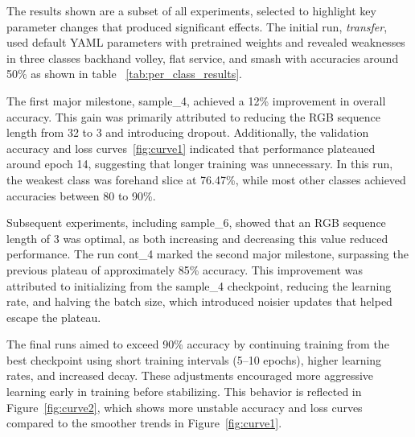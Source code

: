 \documentclass[pdflatex,sn-mathphys-num]{sn-jnl}%
\theoremstyle{thmstyleone}%
\theoremstyle{thmstyletwo}%
\theoremstyle{thmstylethree}%
\begin{document}
The results shown are a subset of all experiments, selected to highlight key parameter changes that produced significant effects. The initial run, \textit{transfer}, used default YAML parameters with pretrained weights and revealed weaknesses in three classes backhand volley, flat service, and smash with accuracies around 50\% as shown in table ~\ref{tab:per_class_results}.

The first major milestone, sample\_4, achieved a 12\% improvement in overall accuracy. This gain was primarily attributed to reducing the RGB sequence length from 32 to 3 and introducing dropout. Additionally, the validation accuracy and loss curves~\ref{fig:curve1} indicated that performance plateaued around epoch 14, suggesting that longer training was unnecessary. In this run, the weakest class was forehand slice at 76.47\%, while most other classes achieved accuracies between 80 to 90\%.

Subsequent experiments, including sample\_6, showed that an RGB sequence length of 3 was optimal, as both increasing and decreasing this value reduced performance. The run cont\_4 marked the second major milestone, surpassing the previous plateau of approximately 85\% accuracy. This improvement was attributed to initializing from the sample\_4 checkpoint, reducing the learning rate, and halving the batch size, which introduced noisier updates that helped escape the plateau.

The final runs aimed to exceed 90\% accuracy by continuing training from the best checkpoint using short training intervals (5–10 epochs), higher learning rates, and increased decay. These adjustments encouraged more aggressive learning early in training before stabilizing. This behavior is reflected in Figure~\ref{fig:curve2}, which shows more unstable accuracy and loss curves compared to the smoother trends in Figure~\ref{fig:curve1}.
\end{document}
